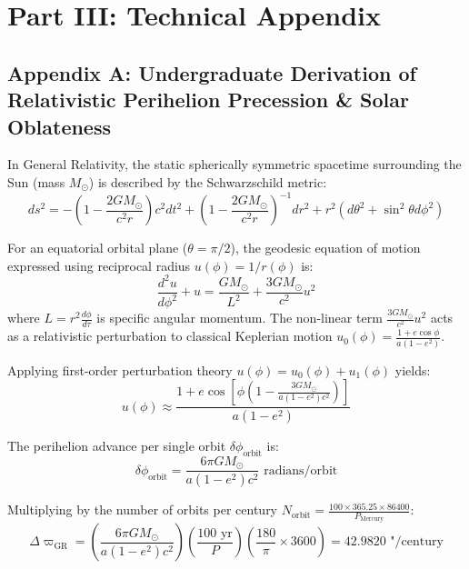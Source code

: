 \documentclass[11pt,a4paper]{article}
\begin{document}
\section*{Part III: Technical Appendix}

\subsection*{Appendix A: Undergraduate Derivation of Relativistic Perihelion Precession \& Solar Oblateness}

In General Relativity, the static spherically symmetric spacetime surrounding the Sun (mass $M_{\odot}$) is described by the Schwarzschild metric:
\begin{equation}
ds^2 = -\left(1 - \frac{2 G M_{\odot}}{c^2 r}\right) c^2 dt^2 + \left(1 - \frac{2 G M_{\odot}}{c^2 r}\right)^{-1} dr^2 + r^2 (d\theta^2 + \sin^2\theta d\phi^2)
\end{equation}

For an equatorial orbital plane ($\theta = \pi/2$), the geodesic equation of motion expressed using reciprocal radius $u(\phi) = 1 / r(\phi)$ is:
\begin{equation}
\frac{d^2 u}{d\phi^2} + u = \frac{G M_{\odot}}{L^2} + \frac{3 G M_{\odot}}{c^2} u^2
\end{equation}
where $L = r^2 \frac{d\phi}{d\tau}$ is specific angular momentum. The non-linear term $\frac{3 G M_{\odot}}{c^2} u^2$ acts as a relativistic perturbation to classical Keplerian motion $u_0(\phi) = \frac{1 + e \cos \phi}{a(1 - e^2)}$.

Applying first-order perturbation theory $u(\phi) = u_0(\phi) + u_1(\phi)$ yields:
\begin{equation}
u(\phi) \approx \frac{1 + e \cos \left[ \phi \left(1 - \frac{3 G M_{\odot}}{a (1 - e^2) c^2}\right) \right]}{a(1 - e^2)}
\end{equation}

The perihelion advance per single orbit $\delta \phi_{\text{orbit}}$ is:
\begin{equation}
\delta \phi_{\text{orbit}} = \frac{6 \pi G M_{\odot}}{a (1 - e^2) c^2} \text{ radians/orbit}
\end{equation}

Multiplying by the number of orbits per century $N_{\text{orbit}} = \frac{100 \times 365.25 \times 86400}{P_{\text{Mercury}}}$:
\begin{equation}
\Delta \varpi_{\text{GR}} = \left( \frac{6 \pi G M_{\odot}}{a (1 - e^2) c^2} \right) \left( \frac{100\text{ yr}}{P} \right) \left( \frac{180}{\pi} \times 3600 \right) = 42.9820\text{ "/century}
\end{equation}
\end{document}
